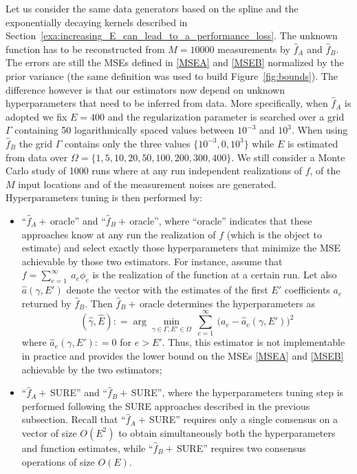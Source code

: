 \documentclass[10pt,twocolumn,twoside]{IEEEtran}					%
\theoremstyle	{plain}
\newcommand{\DefinedAs}			[0]	{\mathrel{\mathop:}=}
\newcommand	{\Figure}				[0]	{Figure}
\newcommand	{\Section}				[0]	{Section}
\begin{document}
Let us consider the same data generators based on the spline and the exponentially decaying kernels described in \Section~\ref{exa:increasing_E_can_lead_to_a_performance_loss}. The unknown function has to be reconstructed from $M=10000$ measurements by $\widehat{f}_{A}$ and $\widehat{f}_{B}$. The errors are still the \acp{MSE} defined in \eqref{MSEA} and \eqref{MSEB} normalized by the prior variance (the same definition was used to build \Figure~\ref{fig:bounds}). The difference however is that our estimators now depend on unknown hyperparameters that need to be inferred from data. More specifically, when $\widehat{f}_{A}$ is adopted we fix $E=400$ and the regularization parameter is searched over a grid $\Gamma$ containing 50 logarithmically spaced values between $10^{-3}$ and $10^3$. When using $\widehat{f}_{B}$ the grid $\Gamma$ contains only the three values $\{10^{-3},0,10^3\}$ while $E$ is estimated from data over $\Omega=\{1,5,10,20,50,100,200,300,400\}$. We still consider a Monte Carlo study of 1000 runs where at any run independent realizations of $f$, of the $M$ input locations and of the measurement noises are generated. Hyperparameters tuning is then performed by:
\begin{itemize}
	\item ``$\widehat{f}_{A}+\,$oracle'' and ``$\widehat{f}_{B}+\,$oracle'', where ``oracle'' indicates that these approaches know at any run the realization of $f$ (which is the object to estimate) and select exactly those hyperparameters that minimize the \ac{MSE} achievable by those two estimators. For instance, assume that $f=\sum_{e=1}^{\infty} \ a_e \phi_{e}$ is the realization of the function at a certain run. Let also $\widehat{a}(\gamma,E')$ denote the vector with the estimates of the first $E'$ coefficients $a_e$ returned by $\widehat{f}_{B}$. Then $\widehat{f}_{B}+\,$oracle determines the hyperparameters as
	$$
		\left( \widehat{\gamma}, \widehat{E} \right)
		\DefinedAs
		\arg\min_{\gamma \in \Gamma,E' \in \Omega} \
		\sum_{e=1}^{\infty} \
		\big( a_e - \widehat{a}_e(\gamma,E') \big)^2
	$$
	where $\widehat{a}_e(\gamma,E') \DefinedAs 0$ for $e>E'$. Thus, this estimator is not implementable in practice and provides the lower bound on the \acp{MSE} \eqref{MSEA} and \eqref{MSEB} achievable by the two estimators; 
\item ``$\widehat{f}_{A}+\,$SURE'' and ``$\widehat{f}_{B}+\,$SURE'', where the hyperparameters tuning step is performed following the \ac{SURE} approaches described in the previous subsection. Recall that ``$\widehat{f}_{A}+\,$SURE'' requires only a single consensus on a vector of size $O(E^2)$ to obtain simultaneously both the hyperparameters and function estimates, while ``$\widehat{f}_{B}+\,$SURE'' requires two consensus operations of size $O(E)$.
\end{itemize}
\end{document}
